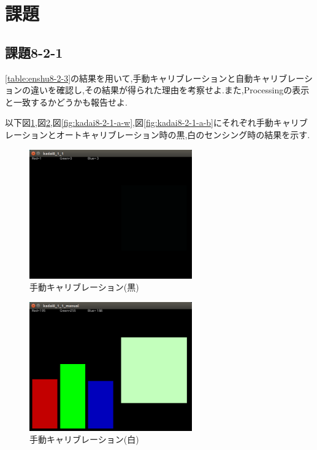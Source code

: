 \documentclass{jarticle}
\begin{document}
\section{課題}

\subsection{課題8-2-1}\label{subsec:kadai8-2-1}
\ref{table:enshu8-2-3}の結果を用いて,手動キャリブレーションと自動キャリブレーションの違いを確認し,その結果が得られた理由を考察せよ.また,Processingの表示と一致するかどうかも報告せよ.

以下図\ref{fig:kadai8-2-1-m-b},図\ref{fig:kadai8-2-1-m-w},図\ref{fig:kadai8-2-1-a-w},図\ref{fig:kadai8-2-1-a-b}にそれぞれ手動キャリブレーションとオートキャリブレーション時の黒,白のセンシング時の結果を示す.

\begin{figure}[H]
\begin{center}
\includegraphics[width=7.0cm]{images/kadai8-1-1-manual-black.png}
\caption{手動キャリブレーション(黒)}
\label{fig:kadai8-2-1-m-b}
\end{center}
\end{figure}


\begin{figure}[H]
\begin{center}
\includegraphics[width=7.0cm]{images/kadai8-1-1-manual-white.png}
\caption{手動キャリブレーション(白)}
\label{fig:kadai8-2-1-m-w}
\end{center}
\end{figure}
\end{document}
